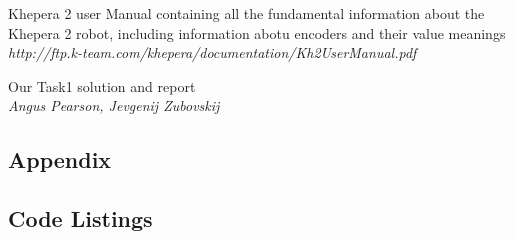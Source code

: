 \documentclass[11pt, a4paper]{article}
\begin{document}
\begin{thebibliography}{8}
\par{Khepera 2 user Manual containing all the fundamental information about the Khepera 2 robot, including information abotu encoders and their value meanings} \\
\textit{http://ftp.k-team.com/khepera/documentation/Kh2UserManual.pdf}

\par{Our Task1 solution and report} \\
\textit{Angus Pearson, Jevgenij Zubovskij}





\end{thebibliography}


\begin{appendices}
\section*{Appendix}
\subsection{Code Listings}









\end{appendices}
\end{document}

